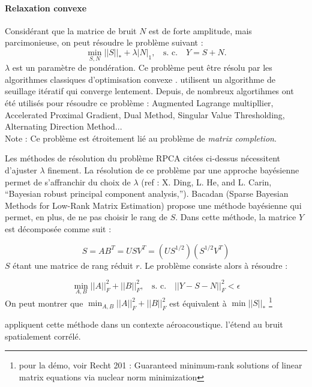 \paragraph{\tbullet Relaxation convexe}

Considérant que la matrice de bruit $N$  est de forte amplitude, mais parcimonieuse, on peut résoudre le problème suivant \citep{Wright2009a} : 
\begin{equation}
    \min_{S,N} ||S||_* + \lambda|N|_1,~~~~\text{s. c.~~~}Y=S+N.
\end{equation}
$\lambda$ est un paramètre de pondération.
Ce problème peut être résolu par les algorithmes classiques d'optimisation convexe .
 \cite{Wright2009a} utilisent un algorithme de seuillage itératif qui converge lentement. Depuis, de nombreux algortihmes ont été utilisés pour résoudre ce problème :  Augmented Lagrange multipllier,  Accelerated Proximal Gradient,  Dual Method, Singular Value Thresholding, Alternating Direction Method...\\
 
 Note : Ce problème est étroitement lié au problème de \textit{matrix completion}.	

Les méthodes de résolution du problème RPCA citées ci-dessus nécessitent d'ajuster $\lambda$  finement. La résolution de ce problème par une approche bayésienne permet de s'affranchir du choix de $\lambda$ (ref : X. Ding, L. He, and L. Carin, “Bayesian robust principal component  analysis,”). Bacadan (Sparse Bayesian Methods for Low-Rank Matrix Estimation) propose une méthode bayésienne qui permet, en plus, de ne pas choisir le rang de $S$. Dans cette méthode, la matrice $Y$ est décomposée comme suit : 

\begin{equation}
    S=AB^T = USV^T = \left(  US^{1/2} \right) \left(  S^{1/2}V^T \right)
\end{equation}
$S$ étant une matrice de rang réduit $r$. Le problème consiste alors à résoudre : 

\begin{equation}
    \min_{A,B} ||A||_{F}^{2}  + ||B||_{F}^{2},~~~~\text{s. c.~~~} ||Y-S-N||^2_{F} < \epsilon
\end{equation}
On peut montrer que  $\min_{A,B} ||A||_{F}^{2}  + ||B||_{F}^{2}$ est équivalent à $\min ||S||_*$ \footnote{pour la démo, voir Recht 201 : Guaranteed minimum-rank solutions of linear matrix equations via nuclear norm minimization}

\cite{finez:hal-01276687} appliquent cette méthode dans un contexte aéroacoustique. \cite{amailland2017} l'étend au bruit spatialement corrélé.

